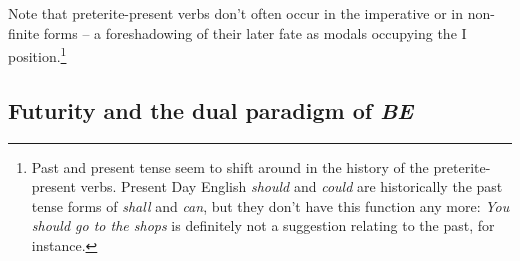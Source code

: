 \begin{table}
    \caption{Finite verb endings in Old English: \emph{mōtan} and \emph{sċulan} (preterite-presents)}\label{tab:OE-pretpres-verb-endings}
\end{table}

\noindent Note that preterite-present verbs don't often occur in the imperative or in non-finite forms -- a foreshadowing of their later fate as modals occupying the I position.\footnote{Past and present tense seem to shift around in the history of the preterite-present verbs. Present Day English \textit{should} and \textit{could} are historically the past tense forms of \textit{shall} and \textit{can}, but they don't have this function any more: \emph{You should go to the shops} is definitely not a suggestion relating to the past, for instance.}

\subsection{Futurity and the dual paradigm of \emph{BE}}\label{OE-be}

